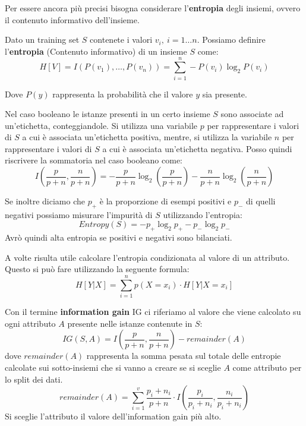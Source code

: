 Per essere ancora più precisi bisogna considerare l'\textbf{entropia} degli insiemi,
ovvero il contenuto informativo dell'insieme.
\begin{definizione}
    Dato un training set $S$ contenete i valori $v_i, \ i = 1 \dots n$. Possiamo
    definire l'\textbf{entropia} (Contenuto informativo) di un insieme $S$ come:
    \begin{equation}
        H[V] = I(P(v_1), \dots, P(v_n)) = \sum_{i = 1}^n - P(v_i) \log_{2} P(v_i)
    \end{equation}

    Dove $P(y)$ rappresenta la probabilità che il valore $y$ sia presente.

    Nel caso booleano le istanze presenti in un certo insieme $S$ sono associate
    ad un'etichetta, conteggiandole. Si utilizza una variabile $p$ per rappresentare
    i valori di $S$ a cui è associata un'etichetta positiva, mentre, si utilizza
    la variabile $n$ per rappresentare i valori di $S$ a cui è associata un'etichetta
    negativa. Posso quindi riscrivere la sommatoria nel caso booleano come:
    \begin{equation}
        I\left(\frac{p}{p + n}, \frac{n}{p + n}\right) = -\frac{p}{p + n} \log_2 \left( \frac{p}{p + n} \right) - \frac{n}{p + n} \log_2 \left(\frac{n}{p + n}\right)
    \end{equation}

    Se inoltre diciamo che $p_{+}$ è la proporzione di esempi positivi e $p_{-}$
    di quelli negativi possiamo misurare l'impurità di $S$ utilizzando l'entropia:
    \begin{equation}
        Entropy(S) = - p_{+} \log_2 p_{+} - p_{-} \log_2 p_{-}
    \end{equation}
    Avrò quindi alta entropia se positivi e negativi sono bilanciati.
\end{definizione}

A volte risulta utile calcolare l'entropia condizionata al valore di un attributo.
Questo si può fare utilizzando la seguente formula:
\begin{equation}
    H[Y | X] = \sum_{i = 1}^n p(X = x_i) \cdot H[Y | X = x_i]
\end{equation}

Con il termine \textbf{information gain} IG ci riferiamo al valore che viene
calcolato su ogni attributo $A$ presente nelle istanze contenute in $S$:
\begin{equation}
    IG(S, A) = I\left(\frac{p}{p + n}, \frac{n}{p + n}\right) - remainder(A)
\end{equation}
dove $remainder(A)$ rappresenta la somma pesata sul totale delle entropie calcolate
sui sotto-insiemi che si vanno a creare se si sceglie $A$ come attributo per lo split dei dati.
\begin{equation}
    remainder(A) = \sum_{i=1}^v \frac{p_i + n_i}{p + n} \cdot I\left(\frac{p_i}{p_i + n_i}, \frac{n_i}{p_i + n_i}\right)
\end{equation}
Si sceglie l'attributo il valore dell'information gain più alto.

